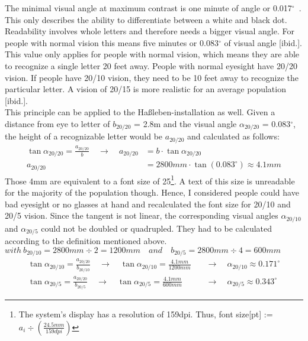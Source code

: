 The minimal visual angle at maximum contrast is one minute of angle or 0.017$^\circ$~\cite{SehwinkelLesbarkeit}. This only describes the ability to differentiate between a white and black dot. Readability involves whole letters and therefore needs a bigger visual angle. For people with normal vision this means five minutes or 0.083$^\circ$ of visual angle [ibid.]. This value only applies for people with normal vision, which means they are able to recognize a single letter 20 feet away. People with normal eyesight have 20/20 vision. If people have 20/10 vision, they need to be 10 feet away to recognize the particular letter. A vision of 20/15 is more realistic for an average population [ibid.].
\\
This principle can be applied to the Haßleben-installation as well. Given a distance from eye to letter of $b_{20/20}$ = 2.8m and the visual angle $\alpha_{20/20}$ = 0.083$^\circ$, the height of a recognizable letter would be $a_{20/20}$ and calculated as follows:
\begin{align*}
	\tan{\alpha_{20/20}} = \frac{a_{20/20}}{b} \quad \to \quad a_{20/20} &= b \cdot \tan{\alpha_{20/20}}
	\\
	a_{20/20} &= 2800mm \cdot \tan{(0.083^\circ)} \approx 4.1mm
\end{align*}
Those 4mm are equivalent to a font size of 25\footnote{The system's display has a resolution of 159dpi. Thus, font size[pt] := $a_{i} \div{(\frac{24.5mm}{159dpi})}$}. A text of this size is unreadable for the majority of the population though. Hence, I considered people could have bad eyesight or no glasses at hand and recalculated the font size for 20/10 and 20/5 vision. Since the tangent is not linear, the corresponding visual angles $\alpha_{20/10}$ and $\alpha_{20/5}$ could not be doubled or quadrupled. They had to be calculated according to the definition mentioned above.
\\
$with \ b_{20/10} = 2800mm \div 2 = 1200mm \quad and \quad b_{20/5} = 2800mm \div 4 = 600mm$
\begin{align*}
	\tan{\alpha_{20/10}} = \frac{a_{20/20}}{b_{20/10}} \quad \to \quad \tan{\alpha_{20/10}} = \frac{4.1mm}{1200mm} \quad &\to \quad \alpha_{20/10} \approx 0.171^\circ
\\
	\tan{\alpha_{20/5}} = \frac{a_{20/20}}{b_{20/5}} \quad \to \quad \tan{\alpha_{20/5}} = \frac{4.1mm}{600mm} \quad &\to \quad \alpha_{20/5} \approx 0.343^\circ
\end{align*}

